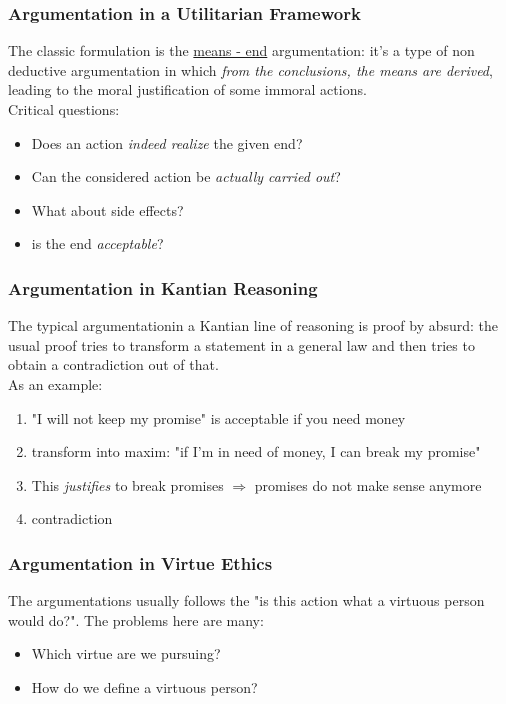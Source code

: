 \documentclass{article}
\begin{document}
			\subsubsection{Argumentation in a Utilitarian Framework}
				The classic formulation is the \underline{means - end} argumentation: it's a type of non deductive argumentation in which \textit{from the conclusions, the means are derived}, leading to the moral justification of some immoral actions.\\
				Critical questions:
				\begin{itemize}
					\item Does an action \textit{indeed realize} the given end?
					\item Can the considered action be \textit{actually carried out}?
					\item What about side effects?
					\item is the end \textit{acceptable}?
				\end{itemize}

			\subsubsection{Argumentation in Kantian Reasoning}
				The typical argumentationin a Kantian line of reasoning is proof by absurd: the usual proof tries to transform a statement in a general law and then tries to obtain a contradiction out of that.\\
				As an example:
				\begin{enumerate}
					\item "I will not keep my promise" is acceptable if you need money
					\item transform into maxim: "if I'm in need of money, I can break my promise"
					\item This \textit{justifies} to break promises $\Rightarrow$ promises do not make sense anymore
					\item contradiction
				\end{enumerate}

			\subsubsection{Argumentation in Virtue Ethics}
				The argumentations usually follows the "is this action what a virtuous person would do?". The problems here are many:
				\begin{itemize}
					\item Which virtue are we pursuing?
					\item How do we define a virtuous person?
				\end{itemize}
\end{document}
